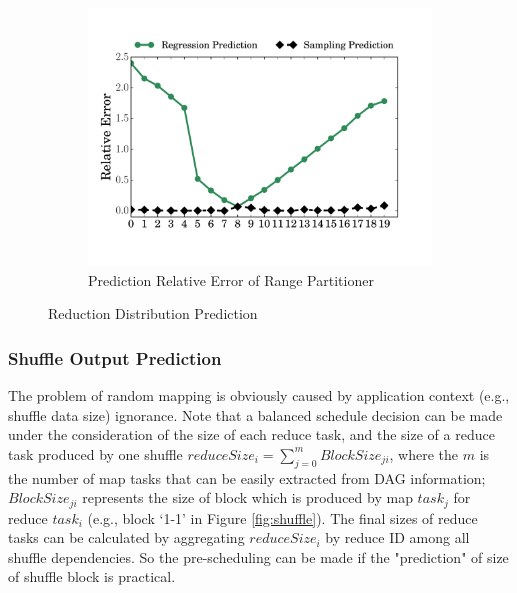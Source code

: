 \begin{figure}
\begin{subfigure}[b]{0.31\linewidth}
		\includegraphics[width=\linewidth]{fig/prediction_relative_error}
		\caption{Prediction Relative Error of Range Partitioner}
		\label{fig:prediction_relative_error}
	\end{subfigure}
	\caption{Reduction Distribution Prediction}
	\label{fig:dis}
	\vspace{-1em}
\end{figure}

\subsubsection{Shuffle Output Prediction}\label{shuffleprediction}
The problem of random mapping is obviously caused by application context (e.g., shuffle data size) ignorance. 
Note that a balanced schedule decision can be made under the consideration of the size of each reduce task, and the size of a reduce task produced by one shuffle $reduceSize_i = \sum_{j=0}^{m} {BlockSize_{ji}}$, 
where the $m$ is the number of map tasks that can be easily extracted from DAG information; 
$BlockSize_{ji}$ represents the size of block which is produced by map $task_j$ for reduce $task_i$ (e.g., block `1-1' in Figure \ref{fig:shuffle}). 
The final sizes of reduce tasks can be calculated by aggregating $reduceSize_i$ by reduce ID among all shuffle dependencies. 
So the pre-scheduling can be made if the "prediction" of size of shuffle block is practical.

